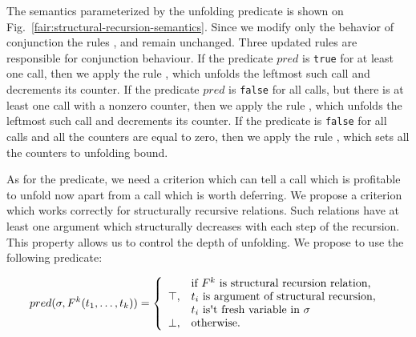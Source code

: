 The semantics parameterized by the unfolding predicate is shown on Fig.~\ref{fair:structural-recursion-semantics}. Since we modify only the behavior of conjunction the rules ,
 and  remain unchanged. Three updated rules are responsible for conjunction behaviour. If the predicate $pred$ is \lstinline{true} for at least one call, then we
apply the rule , which unfolds the leftmost such call and decrements its counter. If the predicate $pred$ is \lstinline{false} for all calls, but there is at least one
call with a nonzero counter, then we apply the rule , which unfolds the leftmost such call and decrements its counter. If the predicate is \lstinline{false} for all calls
and all the counters are equal to zero, then we apply the rule , which sets all the counters to unfolding bound.

As for the predicate, we need a criterion which can tell a call which is profitable to unfold now apart from a call which is worth deferring. We propose a criterion which works correctly
for structurally recursive relations. Such relations have at least one argument which structurally decreases with each step of the recursion. This property allows us to control the depth
of unfolding. We propose to use the following predicate:

\[
pred(\sigma, F^k(t_1, \ldots, t_k)) = \left\{
\begin{array}{cl}
      & \mbox{if } F^k \mbox{ is structural recursion relation, } \\
\top, & t_i \mbox { is argument of structural recursion, } \\
      & t_i \mbox { is\textquotesingle t fresh variable in } \sigma \\
\bot, & \mbox{otherwise.}
\end{array}
\right.
\]

